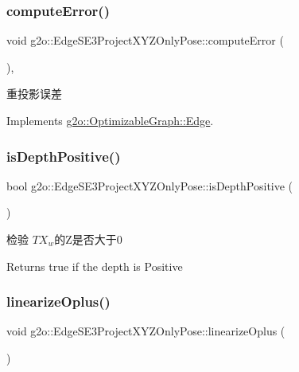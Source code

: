 \subsubsection{\texorpdfstring{compute\+Error()}{computeError()}}
{\footnotesize\ttfamily void g2o\+::\+Edge\+S\+E3\+Project\+X\+Y\+Z\+Only\+Pose\+::compute\+Error (\begin{DoxyParamCaption}{ }\end{DoxyParamCaption})\hspace{0.3cm}{\ttfamily [inline]}, {\ttfamily [virtual]}}

重投影误差 

Implements \mbox{\hyperlink{classg2o_1_1_optimizable_graph_1_1_edge_a1e6d9f4128866982de5e11e03edd7775}{g2o\+::\+Optimizable\+Graph\+::\+Edge}}.

\mbox{\label{classg2o_1_1_edge_s_e3_project_x_y_z_only_pose_abd6f619de5af8855c8ee21fcfad51c9e}} 
\subsubsection{\texorpdfstring{is\+Depth\+Positive()}{isDepthPositive()}}
{\footnotesize\ttfamily bool g2o\+::\+Edge\+S\+E3\+Project\+X\+Y\+Z\+Only\+Pose\+::is\+Depth\+Positive (\begin{DoxyParamCaption}{ }\end{DoxyParamCaption})\hspace{0.3cm}{\ttfamily [inline]}}

检验 $ TX_w $的\+Z是否大于0 \begin{DoxyReturn}{Returns}
true if the depth is Positive 
\end{DoxyReturn}
\mbox{\label{classg2o_1_1_edge_s_e3_project_x_y_z_only_pose_abe6d775aade1277786274c328aa2c38b}} 
\subsubsection{\texorpdfstring{linearize\+Oplus()}{linearizeOplus()}}
{\footnotesize\ttfamily void g2o\+::\+Edge\+S\+E3\+Project\+X\+Y\+Z\+Only\+Pose\+::linearize\+Oplus (\begin{DoxyParamCaption}{ }\end{DoxyParamCaption})\hspace{0.3cm}{\ttfamily [virtual]}}



